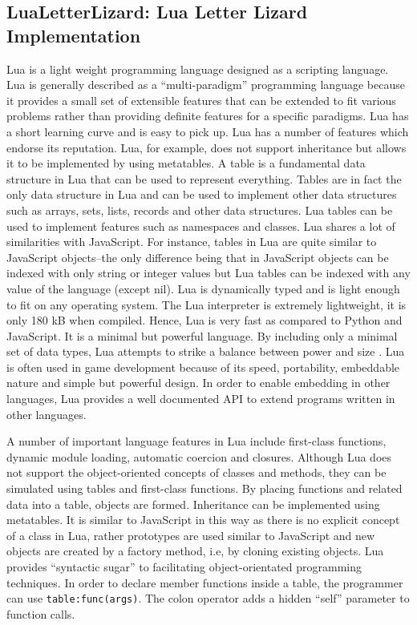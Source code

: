 \subsection{LuaLetterLizard: Lua Letter Lizard Implementation}
\label{luaimpl}

Lua is a light weight programming language designed as a scripting language. Lua is generally described as a ``multi-paradigm'' programming language because it provides a small set of extensible features that can be extended to fit various problems rather than providing definite features for a specific paradigms. Lua has a short learning curve and is easy to pick up. Lua has a number of features which endorse its reputation. Lua, for example, does not support inheritance but allows it to be implemented by using metatables.
A table is a fundamental data structure in Lua that can be used to represent everything. Tables are in fact the only data structure in Lua and can be used to implement other data structures such as arrays, sets, lists, records and other data structures. Lua tables can be used to implement features such as namespaces and classes. Lua shares a lot of similarities with JavaScript. For instance, tables in Lua are quite similar to JavaScript objects--the only difference being that in JavaScript objects can be indexed with only string or integer values but Lua tables can be indexed with any value of the language (except nil). 
Lua is dynamically typed and is light enough to fit on any operating system. The Lua interpreter is extremely lightweight, it is only 180 kB when compiled. Hence, Lua is very fast as compared to Python and JavaScript. It is a minimal but powerful language. By including only a minimal set of data types, Lua attempts to strike a balance between power and size \cite{about_lua}.
Lua is often used in game development because of its speed, portability, embeddable nature and simple but powerful design. In order to enable embedding in other languages, Lua provides a well documented API to extend programs written in other languages. 

A number of important language features in Lua include first-class functions, dynamic module loading, automatic coercion and closures. Although Lua does not support the object-oriented concepts of classes and methods, they can be simulated using tables and first-class functions. By placing functions and related data into a table, objects are formed. Inheritance can be implemented using metatables. It is similar to JavaScript in this way as there is no explicit concept of a class in Lua, rather prototypes are used similar to JavaScript and new objects are created by a factory method, i.e, by cloning existing objects. Lua provides ``syntactic sugar'' to facilitating object-orientated programming techniques. In order to declare member functions inside a table, the programmer can use \texttt{table:func(args)}. The colon operator adds a hidden ``self'' parameter to function calls.

